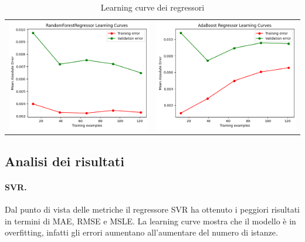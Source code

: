 \begin{table}[H]
\begin{tabular}{c c}
        \includegraphics[scale=0.3]{images/RandomForestRegressor_lc.png} & \includegraphics[scale=0.3]{images/AdaBoostRegressor_lc.png} \\
    \end{tabular}
    \caption{Learning curve dei regressori}
    \label{tab:lc}
\end{table}

\subsection{Analisi dei risultati}


    \paragraph{\textbf{SVR}.}
    Dal punto di vista delle metriche il regressore SVR ha ottenuto i peggiori risultati in termini di MAE, RMSE e MSLE. La learning curve mostra che il modello è in overfitting, infatti gli errori aumentano all'aumentare del numero di istanze.
   
